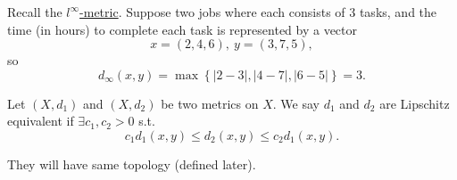 \begin{eg}
    Recall the \hyperref[def: linf-metric]{\(l^{\infty} \)-metric}. Suppose two jobs where each consists of \(3\) tasks, and the time (in hours) to complete each task is represented by a vector 
    \[
        x = (2, 4, 6), \ y = (3, 7, 5),
    \]  so 
    \[
        d_\infty (x, y) = \max \left\{ \vert 2 - 3 \vert, \vert 4 - 7 \vert, \vert 6 - 5 \vert \right\} = 3. 
    \]
\end{eg}

\begin{definition} \label{def: Lipschitz equivalent metric}
    Let \((X, d_1)\) and \((X, d_2)\) be two metrics on \(X\). We say \(d_1\) and \(d_2\) are Lipschitz equivalent if \(\exists c_1, c_2 > 0\) s.t. 
    \[
        c_1 d_1(x, y) \le d_2(x, y) \le c_2 d_1(x, y).
    \] 
\end{definition} 
\begin{remark}
    They will have same topology (defined later).
\end{remark}

